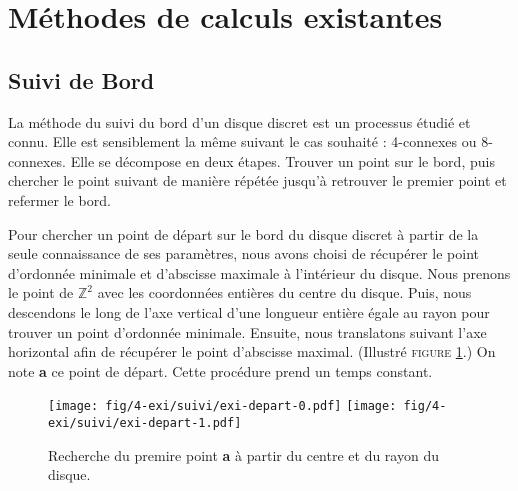 \section{Méthodes de calculs existantes}

\subsection{Suivi de Bord}

La méthode du suivi du bord d'un disque discret est un processus étudié et connu. Elle est sensiblement la même suivant le cas souhaité : 4-connexes ou 8-connexes. Elle se décompose en deux étapes. Trouver un point sur le bord, puis chercher le point suivant de manière répétée jusqu'à retrouver le premier point et refermer le bord.


Pour chercher un point de départ sur le bord du disque discret à partir de la seule connaissance de ses paramètres, nous avons choisi de récupérer le point d'ordonnée minimale et d'abscisse maximale à l'intérieur du disque. Nous prenons le point de $\mathbb{Z}^2$ avec les coordonnées entières du centre du disque. Puis, nous descendons le long de l'axe vertical d'une longueur entière égale au rayon pour trouver un point d'ordonnée minimale. Ensuite, nous translatons suivant l'axe horizontal afin de récupérer le point d'abscisse maximal. (Illustré \textsc{figure} \ref{fig:depart}.) On note \textbf{a} ce point de départ. Cette procédure prend un temps constant. 

\begin{figure}[H]
  \centering
  \texttt{[image: fig/4-exi/suivi/exi-depart-0.pdf]}
  \texttt{[image: fig/4-exi/suivi/exi-depart-1.pdf]}
  \caption{Recherche du premire point \textbf{a} à partir du centre et du rayon du disque.}
\label{fig:depart}
\end{figure}
  


